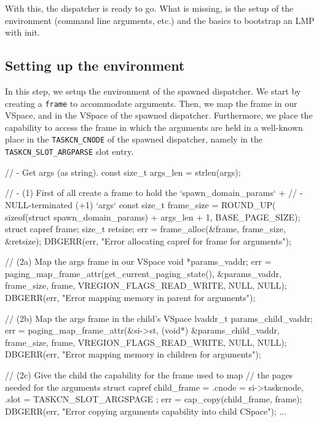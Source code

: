 \documentclass[a4paper,twoside,openright]{report}
\begin{document}
With this, the dispatcher is ready to go.
What is missing, is the setup of the environment (command line arguments, etc.) and the basics to bootstrap an LMP with init.

\subsection{Setting up the environment}
In this step, we setup the environment of the spawned dispatcher.
We start by creating a \texttt{frame} to accommodate arguments.
Then, we map the frame in our VSpace, and in the VSpace of the spawned dispatcher.
Furthermore, we place the capability to access the frame in which the arguments are held in a well-known place in the \texttt{TASKCN\_CNODE} of the spawned dispatcher, namely in the \texttt{TASKCN\_SLOT\_ARGPARSE} slot entry.
\begin{pandacode}
    // - Get args (as string).
    const size_t    args_len   = strlen(args);

    // -  (1) First of all create a frame to hold the `spawn_domain_params` +
    // -  NULL-terminated (+1) `args`
    const size_t frame_size = ROUND_UP(
    sizeof(struct spawn_domain_params) + args_len + 1, BASE_PAGE_SIZE);
    struct capref frame; size_t retsize;
    err = frame_alloc(&frame, frame_size, &retsize);
    DBGERR(err, "Error allocating capref for frame for arguments\n");

    // (2a) Map the args frame in our VSpace
    void *params_vaddr;
    err = paging_map_frame_attr(get_current_paging_state(),
                      &params_vaddr, frame_size, frame,
                      VREGION_FLAGS_READ_WRITE, NULL, NULL);
    DBGERR(err, "Error mapping memory in parent for arguments\n");

    // (2b) Map the args frame in the child's VSpace
    lvaddr_t params_child_vaddr;
    err = paging_map_frame_attr(&si->st,
                      (void*) &params_child_vaddr,
                      frame_size, frame,
                      VREGION_FLAGS_READ_WRITE, NULL, NULL);
    DBGERR(err, "Error mapping memory in children for arguments\n");

    // (2c) Give the child the capability for the frame used to map
    // the pages needed for the arguments
    struct capref child_frame = {
        .cnode = si->taskcnode,
        .slot = TASKCN_SLOT_ARGSPAGE
    };
    err = cap_copy(child_frame, frame);
    DBGERR(err, "Error copying arguments capability into child CSpace\n");
    ...
\end{pandacode} 
\end{document}
